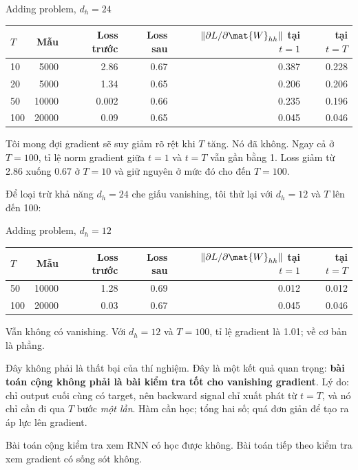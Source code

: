 \begin{measured}{Adding problem, $d_h = 24$}
\small
\begin{tabular}{@{}lrrrrr@{}}
\toprule
$T$ & Mẫu & Loss trước & Loss sau &
$\|\partial L / \partial \mat{W}_{hh}\|$ tại $t=1$ & tại $t=T$ \\
\midrule
10  & 5000  & 2.86 & 0.67 & 0.387 & 0.228 \\
20  & 5000  & 1.34 & 0.65 & 0.206 & 0.206 \\
50  & 10000 & 0.002 & 0.66 & 0.235 & 0.196 \\
100 & 20000 & 0.09 & 0.65 & 0.045 & 0.046 \\
\bottomrule
\end{tabular}
\normalsize
\end{measured}

Tôi mong đợi gradient sẽ suy giảm rõ rệt khi $T$ tăng. Nó đã không. Ngay cả
ở $T = 100$, tỉ lệ norm gradient giữa $t=1$ và $t=T$ vẫn gần bằng 1. Loss
giảm từ 2.86 xuống 0.67 ở $T=10$ và giữ nguyên ở mức đó cho đến $T=100$.

Để loại trừ khả năng $d_h = 24$ che giấu vanishing, tôi thử lại với $d_h
= 12$ và $T$ lên đến 100:

\begin{measured}{Adding problem, $d_h = 12$}
\small
\begin{tabular}{@{}lrrrrr@{}}
\toprule
$T$ & Mẫu & Loss trước & Loss sau &
$\|\partial L / \partial \mat{W}_{hh}\|$ tại $t=1$ & tại $t=T$ \\
\midrule
50  & 10000 & 1.28 & 0.69 & 0.012 & 0.012 \\
100 & 20000 & 0.03 & 0.67 & 0.045 & 0.046 \\
\bottomrule
\end{tabular}
\normalsize
\end{measured}

Vẫn không có vanishing. Với $d_h = 12$ và $T = 100$, tỉ lệ gradient là
1.01; về cơ bản là phẳng.

Đây không phải là thất bại của thí nghiệm. Đây là một kết quả quan trọng:
\textbf{bài toán cộng không phải là bài kiểm tra tốt cho vanishing gradient}.
Lý do: chỉ output cuối cùng có target, nên backward signal chỉ xuất phát từ
$t = T$, và nó chỉ cần đi qua $T$ bước \emph{một lần}. Hàm cần học; tổng hai
số; quá đơn giản để tạo ra áp lực lên gradient.

Bài toán cộng kiểm tra xem RNN có học được không. Bài toán tiếp theo kiểm tra
xem gradient có sống sót không.

%
